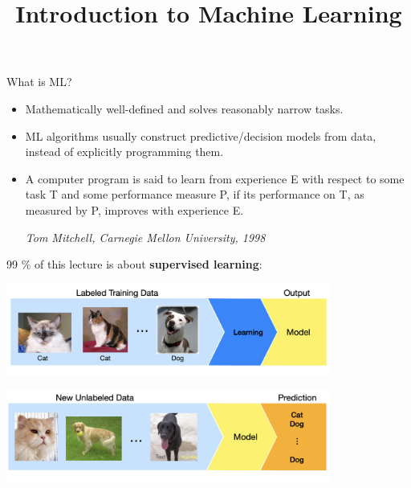 \documentclass[11pt,compress,t,notes=noshow, xcolor=table]{beamer}
\title{Introduction to Machine Learning}
\date{}
\begin{document}
\sloppy


\begin{vbframe}{What is ML?}
\begin{itemize}
 \item \small Mathematically well-defined and solves reasonably narrow tasks.
    \item \small ML algorithms usually construct predictive/decision models from data, instead of explicitly programming them.
    \item A computer program is said to learn from experience E with respect to
  some task T and some performance measure P, if its performance on T, as 
  measured by P, improves with experience E. \\
  \begin{footnotesize}
  \emph{Tom Mitchell, Carnegie Mellon University, 1998}
  \end{footnotesize}
\end{itemize}


\begin{center}
\small 99 $\%$ of this lecture is about \textbf{supervised learning}: 
\end{center} \hspace{0.1cm}

\begin{center}
  \includegraphics[width = 0.8\textwidth]{slides/ml-basics/figure_man/nutshell-ml-basics-catdog-learning.png} 
\end{center}
\begin{center}
  \includegraphics[width = 0.8\textwidth]{slides/ml-basics/figure_man/nutshell-ml-basics-catdog-prediction.png} 
\end{center}

\end{vbframe}
\end{document}

